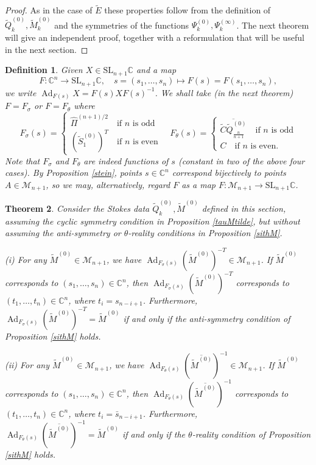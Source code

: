 \documentclass[a4paper,12pt,leqno]{amsart}
\numberwithin{equation}{section}
\theoremstyle{plain}
\newtheorem{theorem}{Theorem}[section]
\newtheorem{definition}[theorem]{Definition}
\theoremstyle{definition}
\newcommand{\C}{\mathbb C}
\newcommand{\Z}{\mathbb Z}
\newcommand{\si}{\sigma}
\renewcommand{\th}{\theta}
\DeclareMathOperator{\Ad}{Ad}
\newcommand{\SL}{\textrm{SL}}
\newcommand{\cM}{\mathcal{M}}
\newcommand{\no}{\noindent}
\newcommand{\Psiz}{  \Psi^{(0)}  }
\newcommand{\Psii}{  \Psi^{(\infty)}  }
\newcommand{\tSz}{  \tilde S^{(0)}  }
\newcommand{\tQz}{  \tilde Q^{(0)}  }
\newcommand{\tE}{  \tilde E  }
\newcommand{\tMz}{  \tilde M^{(0)}  }
\newcommand{\tC}{  \tilde C }
\begin{document}
\begin{proof}
As in the case of $\tE$ these properties follow from
the definition of $\tQz_k,\tMz_k$
and the symmetries of the functions $\Psiz_k,\Psii_k$.
The next theorem will give an independent proof,
together with a reformulation that will be useful in the next section.
\end{proof}

\begin{definition}\label{AdF}
Given $X\in\SL_{n+1}\C$ and a map
\[
F:\C^n\to \SL_{n+1}\C, \quad s=(s_1,\dots,s_n)\mapsto F(s)=F(s_1,\dots,s_n),
\]
we write $\Ad_{F(s)}X = F(s)XF(s)^{-1}$.
We shall take (in the next theorem)
$F=F_\si$ or $F=F_\th$ where
\[
F_\si(s)=
\begin{cases}
\hat\Pi^{(n+1)/2}  \quad\text{if $n$ is odd}
\\
(\tSz_1)^T   \quad\text{if $n$ is even}
\end{cases}
\quad
F_\th(s)=
\begin{cases}
\overline{\tilde C\tQz_{ {\scriptstyle\frac{n}{n+1}}  } }  \quad\text{if $n$ is odd}
\\
C   \quad\text{if $n$ is even.}
\end{cases}
\]
Note that $F_\si$ and $F_\th$ are indeed functions of $s$ (constant in two of the above four cases).
By Proposition \ref{stein},  points $s\in\C^n$ correspond bijectively to points $A\in \cM_{n+1}$, so we may, alternatively,  regard $F$ as a map
$F:\cM_{n+1}\to \SL_{n+1}\C$.
\end{definition}

\begin{theorem}\label{preservesM}  Consider the Stokes data $\tQz_k,\tMz$
defined in this section, assuming the cyclic symmetry condition
in Proposition \ref{tauMtilde}, but without assuming the anti-symmetry or $\theta$-reality
conditions in Proposition \ref{sithM}.

\no(i) For any $\tMz\in\cM_{n+1}$, we have $\Ad_{F_\si(s)} (\tMz)^{-T} \in \cM_{n+1}$.
If $\tMz$ corresponds to $(s_1,\dots,s_n)\in\C^n$, then $\Ad_{F_\si(s)} (\tMz)^{-T}$
corresponds to $(t_1,\dots,t_n)\in\C^n$,
where $t_i=s_{n-i+1}$.
Furthermore, $\Ad_{F_\si(s)} (\tMz)^{-T}=\tMz$ if and only if
the anti-symmetry condition of Proposition \ref{sithM} holds.

\no(ii)  For any $\tMz\in\cM_{n+1}$, we have
$\Ad_{F_\th(s)} (\overline{\tMz  })^{-1} \in \cM_{n+1}$.
If $\tMz$ corresponds to $(s_1,\dots,s_n)\in\C^n$, then $\Ad_{F_\th(s)} (\overline{\tMz  })^{-1}$
corresponds to $(t_1,\dots,t_n)\in\C^n$,
where $t_i=\bar s_{n-i+1}$.
Furthermore, $\Ad_{F_\th(s)} (\overline{\tMz  })^{-1}=\tMz$ if and only if
the $\th$-reality condition of Proposition \ref{sithM} holds.
\end{theorem}
\end{document}
